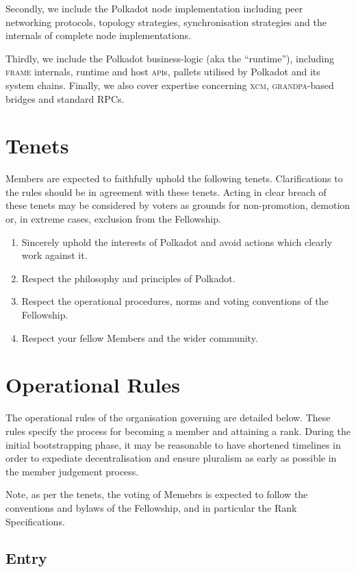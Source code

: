 \documentclass[9pt,oneside]{amsart}
\begin{document}
Secondly, we include the Polkadot node implementation including peer networking protocols, topology strategies, synchronisation strategies and the internals of complete node implementations.

Thirdly, we include the Polkadot business-logic (aka the ``runtime''), including \textsc{frame} internals, runtime and host \textsc{api}s, pallets utilised by Polkadot and its system chains. Finally, we also cover expertise concerning \textsc{xcm}, \textsc{grandpa}-based bridges and standard \textsc{RPC}s.

\section{Tenets}

Members are expected to faithfully uphold the following tenets. Clarifications to the rules should be in agreement with these tenets. Acting in clear breach of these tenets may be considered by voters as grounds for non-promotion, demotion or, in extreme cases, exclusion from the Fellowship.

\begin{enumerate}
\item Sincerely uphold the interests of Polkadot and avoid actions which clearly work against it.
\item Respect the philosophy and principles of Polkadot.
\item Respect the operational procedures, norms and voting conventions of the Fellowship.
\item Respect your fellow Members and the wider community.
\end{enumerate}

\section{Operational Rules}\label{operational-rules}

The operational rules of the organisation governing are detailed below. These rules specify the process for becoming a member and attaining a rank. During the initial bootstrapping phase, it may be reasonable to have shortened timelines in order to expediate decentralisation and ensure pluralism as early as possible in the member judgement process.

Note, as per the tenets, the voting of Memebrs is expected to follow the conventions and bylaws of the Fellowship, and in particular the Rank Specifications.

\subsection{Entry}
\end{document}
